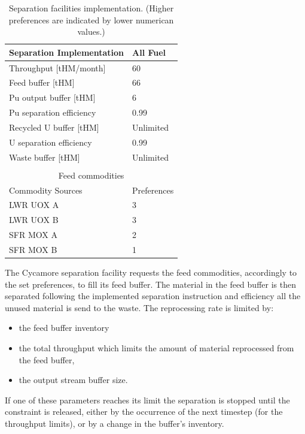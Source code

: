 \documentclass[12pt]{article}
\begin{document}
\begin{table}[h!]
    \centering
    \begin{tabular}{ll}
    \hline
    Separation Implementation  &  All Fuel   \\
    \hline
    Throughput [tHM/month]     &  60         \\
    Feed buffer [tHM]          &  66         \\
    Pu output buffer  [tHM]    &  6          \\
    Pu separation efficiency   &  0.99       \\
    Recycled U buffer [tHM]    &  Unlimited  \\
    U separation efficiency    &  0.99       \\
    Waste buffer [tHM]         &  Unlimited  \\ 
                                             \\
    \multicolumn{2}{c}{Feed commodities}    \\
    \hline
    Commodity Sources         &  Preferences\\
    \hline
    LWR UOX A                 &  3           \\
    LWR UOX B                 &  3           \\
    SFR MOX A                 &  2           \\
    SFR MOX B                 &  1           \\ 
    \hline
    \end{tabular}
    \caption{Separation facilities implementation. (Higher preferences are indicated by lower numerican values.)}
    \label{tab:fuelfab_2}
\end{table}

The Cycamore separation facility requests the feed commodities, accordingly to the
set preferences, to fill its feed buffer. The material in the feed buffer is then
separated following the implemented separation instruction and efficiency all the
unused material is send to the waste. The reprocessing rate is limited by:

\begin{itemize}

  \item the feed buffer inventory
  \item the total throughput which limits the amount of material reprocessed from
    the feed buffer,
  \item the output stream buffer size.

\end{itemize}
If one of these parameters reaches its limit the separation is stopped until the
constraint is released, either by the occurrence of the next timestep (for the
throughput limits), or by a change in the buffer's inventory. 
\end{document}
